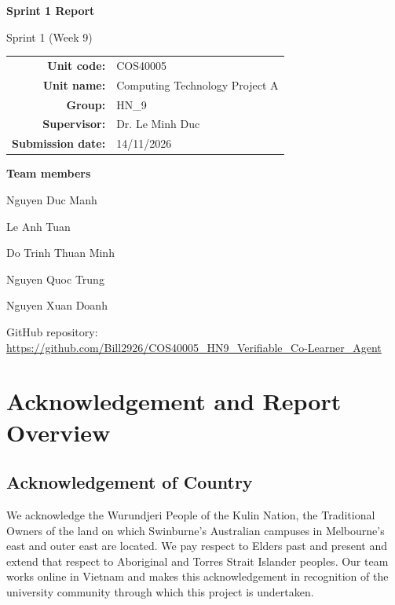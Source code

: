 \documentclass[11pt,a4paper]{article}
\begin{document}
\begin{titlepage}
\centering
\vspace*{3cm}
{\Huge\bfseries Sprint 1 Report\par}
\vspace{0.6cm}
{\Large Sprint 1 (Week 9)\par}
\vspace{2cm}
\begin{tabular}{>{\bfseries}r l}
Unit code: & COS40005 \\
Unit name: & Computing Technology Project A \\
Group: & HN\_9 \\
Supervisor: & Dr. Le Minh Duc \\
Submission date: & 14/11/2026 \\
\end{tabular}
\par\vspace{1.5cm}
{\bfseries Team members\par}
\vspace{0.3cm}
Nguyen Duc Manh\par
Le Anh Tuan\par
Do Trinh Thuan Minh\par
Nguyen Quoc Trung\par
Nguyen Xuan Doanh\par
\vfill
{\small GitHub repository: \url{https://github.com/Bill2926/COS40005_HN9_Verifiable_Co-Learner_Agent}\par}
\end{titlepage}

\tableofcontents
\clearpage
\section*{Acknowledgement and Report Overview}
\subsection*{Acknowledgement of Country}
We acknowledge the Wurundjeri People of the Kulin Nation, the Traditional Owners of the land on which Swinburne's Australian campuses in Melbourne's east and outer east are located. We pay respect to Elders past and present and extend that respect to Aboriginal and Torres Strait Islander peoples. Our team works online in Vietnam and makes this acknowledgement in recognition of the university community through which this project is undertaken.
\end{document}
